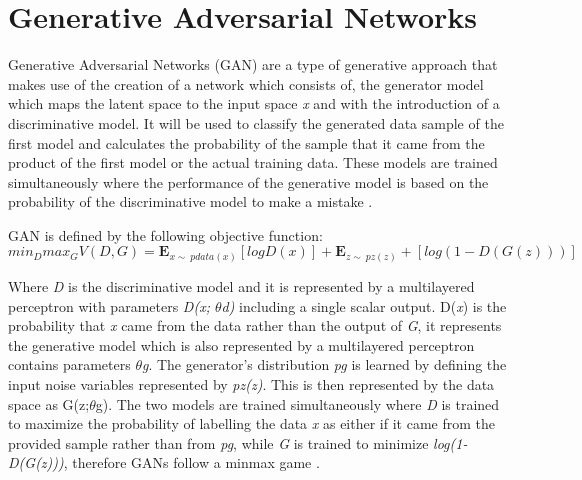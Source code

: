\section{Generative Adversarial Networks}

Generative Adversarial Networks  (GAN) are a type of generative approach that makes use of the creation of a network which consists of, the generator model which maps the latent space to the input space \textit{x} and with the introduction of a discriminative model. It will be used to classify the generated data sample of the first model and calculates the probability of the sample that it came from the product of the first model or the actual training data. These models  are trained simultaneously where the performance of the generative model is based on the probability of the discriminative model to make a mistake  \citet{goodfellow:2014}. 

GAN is defined by the following objective function:
\begin{equation}\label{minmax}
min_{D}max_{G} V(D,G)= \mathbf{E}_{x \sim\ pdata(x)}[log D(x)] + \mathbf{E}_{z\sim\ pz(z)} + [log(1 - D(G(z)))]
\end{equation}

Where \textit{D} is the discriminative model and it is represented by a multilayered perceptron with parameters \textit{D(x; $\theta$d)} including a single scalar output. D(\textit{x}) is the probability that \textit{x}  came from the data rather than the output of \textit{G}, it represents the generative model which is also represented by a multilayered perceptron contains parameters $\theta$\textit{g}. The generator's distribution \textit{pg} is learned by defining the input noise variables represented by \textit{pz(z)}. This is then represented by the data space as G(z;$\theta$g). The two models are trained simultaneously where \textit{D} is trained to maximize the probability of labelling the data \textit{x} as either if it came from the provided sample rather than from \textit{pg}, while \textit{G} is trained to minimize \textit{log(1-D(G(z)))}, therefore GANs follow a minmax game \citet{goodfellow:2014}.

